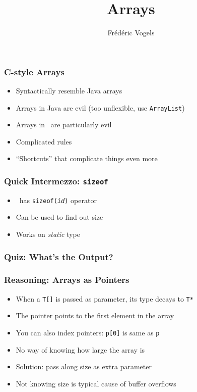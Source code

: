 \documentclass{../ucll-slides}
\title{Arrays}
\author{Fr\'ed\'eric Vogels}
\begin{document}
\begin{frame}
  \titlepage
\end{frame}

\begin{frame}
  \frametitle{C-style Arrays}
  \begin{itemize}
    \item Syntactically resemble Java arrays
    \item Arrays in Java are evil (too unflexible, use {\tt ArrayList})
    \item Arrays in \cpp\ are particularly evil
    \item Complicated rules
    \item ``Shortcuts'' that complicate things even more
  \end{itemize}
\end{frame}

\begin{frame}
  \frametitle{Quick Intermezzo: {\tt sizeof}}
  \begin{itemize}
    \item \cpp\ has {\tt sizeof({\it id})} operator
    \item Can be used to find out size
    \item Works on \emph{static} type
  \end{itemize}
\end{frame}

\begin{frame}
  \frametitle{Quiz: What's the Output?}
\end{frame}

\begin{frame}
  \frametitle{Reasoning: Arrays as Pointers}
  \begin{itemize}
    \item When a {\tt T[]} is passed as parameter, its type decays to {\tt T*}
    \item The pointer points to the first element in the array
    \item You can also index pointers: {\tt p[0]} is same as {\tt *p}
    \item No way of knowing how large the array is
    \item Solution: pass along size as extra parameter
    \item Not knowing size is typical cause of buffer overflows
  \end{itemize}
\end{frame}
\end{document}
